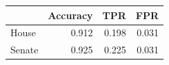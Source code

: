 
\begin{tabular}{lrrr}
\toprule
  & Accuracy & TPR & FPR\\
\midrule
House & 0.912 & 0.198 & 0.031\\
Senate & 0.925 & 0.225 & 0.031\\
\bottomrule
\end{tabular}

